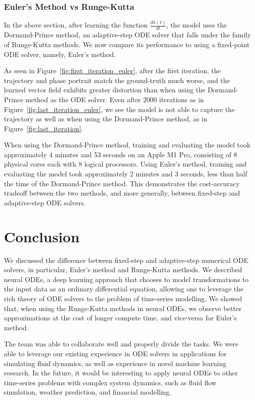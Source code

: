 \documentclass[11pt]{article}
\begin{document}
\subsubsection{Euler's Method vs Runge-Kutta}

In the above section, after learning the function $\frac{dh(t)}{dt}$, the model uses the Dormand-Prince method, an adaptive-step ODE solver that falls under the family of Runge-Kutta methods. We now compare its performance to using a fixed-point ODE solver, namely, Euler's method.

As seen in Figure~\ref{fig:first_iteration_euler}, after the first iteration, the trajectory and phase portrait match the ground-truth much worse, and the learned vector field exhibits greater distortion than when using the Dormand-Prince method as the ODE solver. Even after 2000 iterations as in Figure~\ref{fig:last_iteration_euler}, we see the model is not able to capture the trajectory as well as when using the Dormand-Prince method, as in Figure~\ref{fig:last_iteration}.

When using the Dormand-Prince method, training and evaluating the model took approximately 4 minutes and 53 seconds on an Apple M1 Pro, consisting of 8 physical cores each with 8 logical processors. Using Euler's method, training and evaluating the model took approximately 2 minutes and 3 seconds, less than half the time of the Dormand-Prince method. This demonstrates the cost-accuracy tradeoff between the two methods, and more generally, between fixed-step and adaptive-step ODE solvers.

\section{Conclusion}

We discussed the difference between fixed-step and adaptive-step numerical ODE solvers, in particular, Euler's method and Runge-Kutta methods. We described neural ODEs, a deep learning approach that chooses to model transformations to the input data as an ordinary differential equation, allowing one to leverage the rich theory of ODE solvers to the problem of time-series modelling. We showed that, when using the Runge-Kutta methods in neural ODEs, we observe better approximations at the cost of longer compute time, and vice-versa for Euler's method.

The team was able to collaborate well and properly divide the tasks. We were able to leverage our existing experience in ODE solvers in applications for simulating fluid dynamics, as well as experience in novel machine learning research. In the future, it would be interesting to apply neural ODEs to other time-series problems with complex system dynamics, such as fluid flow simulation, weather prediction, and financial modelling.
\end{document}
